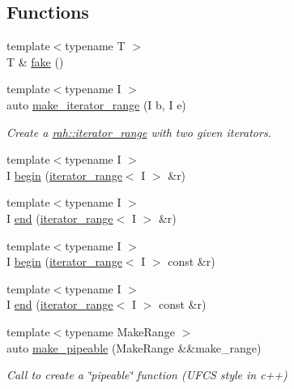 \subsection*{Functions}
\begin{DoxyCompactItemize}
\item 
{\footnotesize template$<$typename T $>$ }\\T \& \mbox{\hyperlink{namespacerah_a11785bbdf970efa1bc57fc14993b77bf}{fake}} ()
\item 
{\footnotesize template$<$typename I $>$ }\\auto \mbox{\hyperlink{namespacerah_a4e145bfeb8a932058e20fc4cb4e7c206}{make\+\_\+iterator\+\_\+range}} (I b, I e)
\begin{DoxyCompactList}\small\item\em Create a \mbox{\hyperlink{structrah_1_1iterator__range}{rah\+::iterator\+\_\+range}} with two given iterators. \end{DoxyCompactList}\item 
{\footnotesize template$<$typename I $>$ }\\I \mbox{\hyperlink{namespacerah_a2c4a19e57cc4e0753e93830f247def6d}{begin}} (\mbox{\hyperlink{structrah_1_1iterator__range}{iterator\+\_\+range}}$<$ I $>$ \&r)
\item 
{\footnotesize template$<$typename I $>$ }\\I \mbox{\hyperlink{namespacerah_aaddd1442cd76b96876e692cdefe7261d}{end}} (\mbox{\hyperlink{structrah_1_1iterator__range}{iterator\+\_\+range}}$<$ I $>$ \&r)
\item 
{\footnotesize template$<$typename I $>$ }\\I \mbox{\hyperlink{namespacerah_a14e69321e6772651b349cb31467ea3a2}{begin}} (\mbox{\hyperlink{structrah_1_1iterator__range}{iterator\+\_\+range}}$<$ I $>$ const \&r)
\item 
{\footnotesize template$<$typename I $>$ }\\I \mbox{\hyperlink{namespacerah_a6b31fe80bf81abf3149df010cb265e20}{end}} (\mbox{\hyperlink{structrah_1_1iterator__range}{iterator\+\_\+range}}$<$ I $>$ const \&r)
\item 
{\footnotesize template$<$typename Make\+Range $>$ }\\auto \mbox{\hyperlink{namespacerah_a274b78c4c0af5dd58ce280f02223fb55}{make\+\_\+pipeable}} (Make\+Range \&\&make\+\_\+range)
\begin{DoxyCompactList}\small\item\em Call to create a \char`\"{}pipeable\char`\"{} function (U\+F\+CS style in c++) \end{DoxyCompactList}\item 

\end{DoxyCompactItemize}
